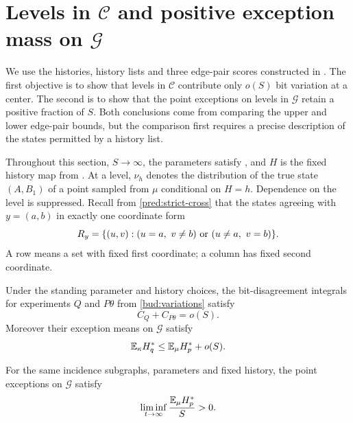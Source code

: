 \section{\texorpdfstring{Levels in $\mathcal C$ and positive exception mass on $\mathcal G$}{Levels in C and positive exception mass on G}}\label{sec:common}

We use the histories, history lists and three edge-pair scores constructed in
. The first objective is to show that levels in $\mathcal C$ contribute
only \(o(S)\) bit variation at a center. The second is to show that the point
exceptions on levels in $\mathcal G$ retain a positive fraction of \(S\). Both
conclusions come from comparing the upper and lower edge-pair bounds, but the
comparison first requires a precise description of the states permitted by a
history list.

Throughout this section, \(S\to\infty\), the parameters satisfy
, and \(H\) is the fixed history map from
. At a level, \(\nu_h\) denotes the distribution of
the true state \((A,B_1)\) of a point sampled from \(\mu\) conditional on
\(H=h\). Dependence on the level is suppressed. Recall from
\eqref{pred:strict-cross} that the states agreeing with \(y=(a,b)\) in exactly one coordinate form
\[
 R_y=\{(u,v):(u=a,\ v\ne b)\ \text{or}\ (u\ne a,\ v=b)\}.
\]
A row means a set with fixed first coordinate; a column has fixed second
coordinate.

\begin{proposition}\label{com:variation}
Under the standing parameter and history choices, the bit-disagreement integrals for experiments $Q$ and $P\theta$ from \eqref{bud:variations} satisfy
\begin{equation}\label{com:variation-eq}
 C_Q+C_{P\theta}=o(S).
\end{equation}
Moreover their exception means on $\mathcal G$ satisfy
\begin{equation}\label{com:center-rare}
 \mathbb E_\kappa H_q^*\le\mathbb E_\mu H_p^*+o(S).
\end{equation}
\end{proposition}

\begin{proposition}\label{com:rare-positive}
For the same incidence subgraphs, parameters and fixed history, the point exceptions on $\mathcal G$ satisfy
\begin{equation}\label{com:rare-positive-eq}
 \liminf_{t\to\infty}\frac{\mathbb E_\mu H_p^*}{S}>0.
\end{equation}
\end{proposition}

